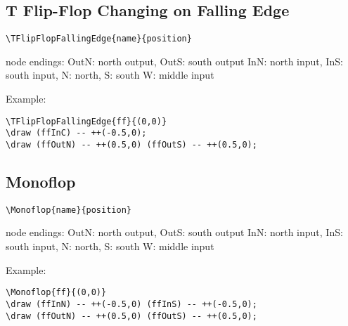 \documentclass[parskip=full]{scrartcl}
\begin{document}
\subsection{T Flip-Flop Changing on Falling Edge}

\begin{verbatim}
\TFlipFlopFallingEdge{name}{position}
\end{verbatim}
node endings: OutN: north output, OutS: south output
              InN: north input, InS: south input,
              N: north, S: south
              W: middle input

Example:\\
\begin{minipage}{0.8\textwidth}
\begin{verbatim}
\TFlipFlopFallingEdge{ff}{(0,0)}
\draw (ffInC) -- ++(-0.5,0);
\draw (ffOutN) -- ++(0.5,0) (ffOutS) -- ++(0.5,0);
\end{verbatim}
\end{minipage}
\begin{minipage}{0.19\textwidth}
\end{minipage}

\subsection{Monoflop}

\begin{verbatim}
\Monoflop{name}{position}
\end{verbatim}
node endings: OutN: north output, OutS: south output
              InN: north input, InS: south input,
              N: north, S: south
              W: middle input

Example:\\
\begin{minipage}{0.8\textwidth}
\begin{verbatim}
\Monoflop{ff}{(0,0)}
\draw (ffInN) -- ++(-0.5,0) (ffInS) -- ++(-0.5,0);
\draw (ffOutN) -- ++(0.5,0) (ffOutS) -- ++(0.5,0);
\end{verbatim}
\end{minipage}
\begin{minipage}{0.19\textwidth}
\end{minipage}
\end{document}
